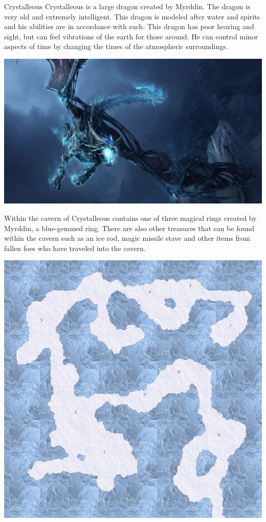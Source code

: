 \begin{commentbox}{Crystalleous}
	Crystalleous is a large dragon created by Myrddin. The dragon is very old and extremely intelligent. This dragon is modeled after water and spirits and his abilities are in accordance with such. This dragon has poor hearing and sight, but can feel vibrations of the earth for those around. He can control minor aspects of time by changing the times of the atmospheric surroundings.
	
	\begin{center}
	\includegraphics[width=0.7\linewidth]{img/WoW/crystaldragon.jpg}
	\end{center}

	Within the cavern of Crystalleous contains one of three magical rings created by Myrddin, a blue-gemmed ring. There are also other treasures that can be found within the cavern such as an ice rod, magic missile stave and other items from fallen foes who have traveled into the cavern. 
	
	\begin{center}
	\includegraphics[width=0.7\linewidth]{img/maps/crystalleous.jpg}
	\end{center}
\end{commentbox}

